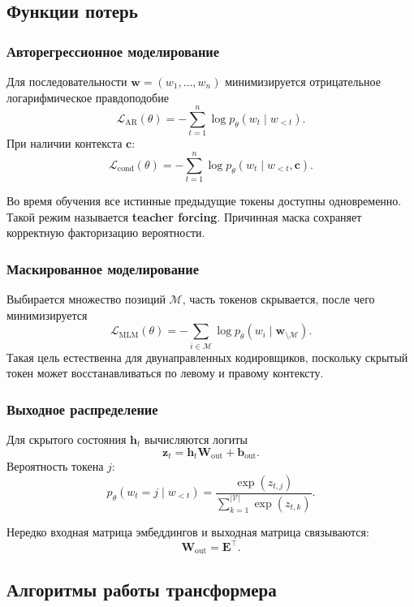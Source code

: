 \documentclass[12pt,a4paper]{article}
\theoremstyle{definition}
\newcommand{\1}{\mathbf{1}}
\begin{document}
\subsection{Функции потерь}

\subsubsection{Авторегрессионное моделирование}

Для последовательности $\bm{w}=(w_1,\ldots,w_n)$ минимизируется
отрицательное логарифмическое правдоподобие
\[
    \mathcal{L}_{\text{AR}}(\theta)
    =
    -\sum_{t=1}^{n}
    \log p_\theta(w_t\mid w_{<t}).
\]
При наличии контекста $\bm{c}$:
\[
    \mathcal{L}_{\text{cond}}(\theta)
    =
    -\sum_{t=1}^{n}
    \log p_\theta(w_t\mid w_{<t},\bm{c}).
\]

Во время обучения все истинные предыдущие токены доступны одновременно.
Такой режим называется \textbf{teacher forcing}. Причинная маска
сохраняет корректную факторизацию вероятности.

\subsubsection{Маскированное моделирование}

Выбирается множество позиций $\mathcal{M}$, часть токенов скрывается,
после чего минимизируется
\[
    \mathcal{L}_{\text{MLM}}(\theta)
    =
    -\sum_{i\in\mathcal{M}}
    \log p_\theta
    \left(
        w_i\mid \bm{w}_{\setminus\mathcal{M}}
    \right).
\]
Такая цель естественна для двунаправленных кодировщиков, поскольку
скрытый токен может восстанавливаться по левому и правому контексту.

\subsubsection{Выходное распределение}

Для скрытого состояния $\bm{h}_t$ вычисляются логиты
\[
    \bm{z}_t=\bm{h}_t\bm{W}_{\text{out}}+\bm{b}_{\text{out}}.
\]
Вероятность токена $j$:
\[
    p_\theta(w_t=j\mid w_{<t})
    =
    \frac{\exp(z_{t,j})}
         {\sum_{k=1}^{|\mathcal{V}|}\exp(z_{t,k})}.
\]

Нередко входная матрица эмбеддингов и выходная матрица связываются:
\[
    \bm{W}_{\text{out}}=\bm{E}^{\top}.
\]

\subsection{Алгоритмы работы трансформера}
\end{document}
